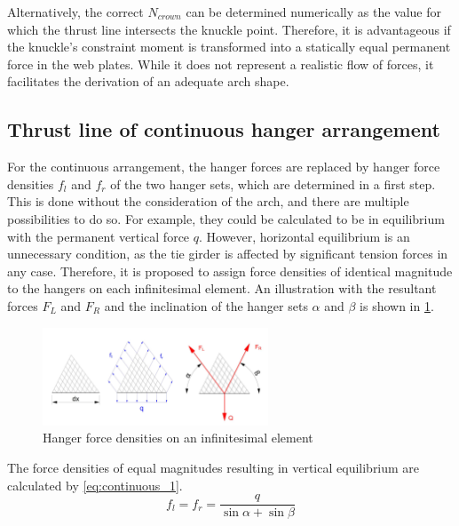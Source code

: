 Alternatively, the correct $N_{crown}$ can be determined numerically as the value for which the thrust line intersects the knuckle point. Therefore, it is advantageous if the knuckle's constraint moment is transformed into a statically equal permanent force in the web plates. While it does not represent a realistic flow of forces, it facilitates the derivation of an adequate arch shape.


\subsection{Thrust line of continuous hanger arrangement} \label{sec:continuous}
For the continuous arrangement, the hanger forces are replaced by hanger force densities $f_l$ and $f_r$ of the two hanger sets, which are determined in a first step. This is done without the consideration of the arch, and there are multiple possibilities to do so. For example, they could be calculated to be in equilibrium with the permanent vertical force $q$. However, horizontal equilibrium is an unnecessary condition, as the tie girder is affected by significant tension forces in any case. Therefore, it is proposed to assign force densities of identical magnitude to the hangers on each infinitesimal element. An illustration with the resultant forces $F_L$ and $F_R$ and the inclination of the hanger sets $\alpha$ and $\beta$ is shown in \cref{fig:continuous_1}.
\begin{figure}[H]
    \centering
    \includegraphics[trim={0 0.5cm 0 1.8cm},clip, width=0.6\textwidth]{overleaf/Appendix/Pictures/continuous_thrust_line_1.PNG}
    \caption{Hanger force densities on an infinitesimal element}
    \label{fig:continuous_1}
\end{figure}

The force densities of equal magnitudes resulting in vertical equilibrium are calculated by \cref{eq:continuous_1}.
\begin{equation}
    f_l=f_r=\frac{q}{\sin{\alpha}+ \sin{\beta}}
    \label{eq:continuous_1}
\end{equation}

